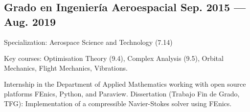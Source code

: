 \subsection{{Grado en Ingeniería Aeroespacial} \hfill	Sep. 2015 --- Aug. 2019}  
\begin{zitemize}
\item Specialization: Aerospace Science and Technology (7.14)
\item Key courses: Optimisation Theory (9.4), Complex Analysis (9.5), Orbital Mechanics, Flight
Mechanics, Vibrations.

\item Internship in the Department of Applied Mathematics working with open source platforms FEnics, Python, and
Paraview. Dissertation (Trabajo Fin de Grado, TFG): Implementation of a compressible Navier-Stokes solver using FEnics. 

\end{zitemize}
